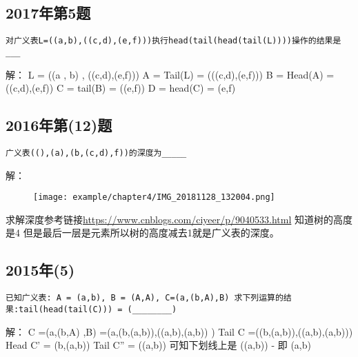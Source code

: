 \subsection{2017年第5题}
\begin{lstlisting}[basicstyle=\small\ttfamily, caption={}, numbers=none]
对广义表L=((a,b),((c,d),(e,f)))执行head(tail(head(tail(L))))操作的结果是___
\end{lstlisting}
解：\newline
L = ((a , b) , ((c,d),(e,f)))\newline
A = Tail(L) = (((c,d),(e,f)))\newline
B = Head(A) =((c,d),(e,f))\newline
C = tail(B) = ((e,f))\newline
D = head(C) = (e,f)\newline

\subsection{2016年第(12)题}
\begin{lstlisting}[basicstyle=\small\ttfamily, caption={}, numbers=none]
广义表((),(a),(b,(c,d),f))的深度为_____
\end{lstlisting}
解：\newline
\begin{figure}[H]
	\centering  %
	\texttt{[image: example/chapter4/IMG\_20181128\_132004.png]}
\end{figure}

求解深度参考链接\url{https://www.cnblogs.com/ciyeer/p/9040533.html}\newline
知道树的高度是4 但是最后一层是元素所以树的高度减去1就是广义表的深度。\newline

\subsection{2015年(5)}

\begin{lstlisting}[basicstyle=\small\ttfamily, caption={}, numbers=none]
已知广义表: A = (a,b), B = (A,A), C=(a,(b,A),B) 求下列运算的结果:tail(head(tail(C))) = (________)
\end{lstlisting}
解：\newline
C =(a,(b,A) ,B) \newline
  =(a,(b,(a,b)),((a,b),(a,b)) )\newline
Tail C =((b,(a,b)),((a,b),(a,b))) \newline
Head C' = (b,(a,b))\newline
Tail C'' = ((a,b))\newline
可知下划线上是  ((a,b)) - 即 (a,b)\newline